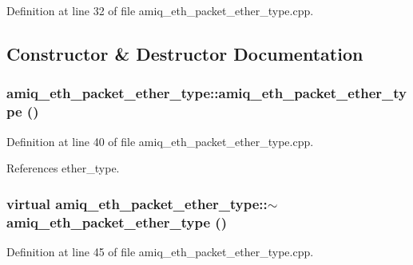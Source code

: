 Definition at line 32 of file amiq\_\-eth\_\-packet\_\-ether\_\-type.cpp.

\subsection{Constructor \& Destructor Documentation}
\hypertarget{classamiq__eth__packet__ether__type_a1564c7b9fd6f3ecde8d224c2bb3f4294}{
\subsubsection[{amiq\_\-eth\_\-packet\_\-ether\_\-type}]{\setlength{\rightskip}{0pt plus 5cm}amiq\_\-eth\_\-packet\_\-ether\_\-type::amiq\_\-eth\_\-packet\_\-ether\_\-type ()}}
\label{classamiq__eth__packet__ether__type_a1564c7b9fd6f3ecde8d224c2bb3f4294}


Definition at line 40 of file amiq\_\-eth\_\-packet\_\-ether\_\-type.cpp.

References ether\_\-type.\hypertarget{classamiq__eth__packet__ether__type_a7e5ab86fde67a32a33aa71871be5023b}{
\subsubsection[{$\sim$amiq\_\-eth\_\-packet\_\-ether\_\-type}]{\setlength{\rightskip}{0pt plus 5cm}virtual amiq\_\-eth\_\-packet\_\-ether\_\-type::$\sim$amiq\_\-eth\_\-packet\_\-ether\_\-type ()}}
\label{classamiq__eth__packet__ether__type_a7e5ab86fde67a32a33aa71871be5023b}


Definition at line 45 of file amiq\_\-eth\_\-packet\_\-ether\_\-type.cpp.

